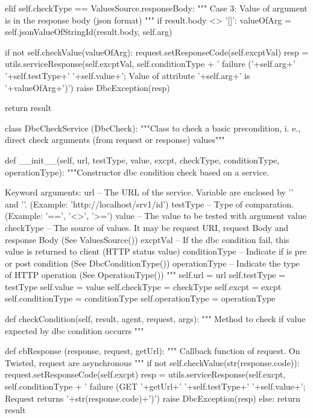         
        elif self.checkType == ValuesSource.responseBody:
            """ Case 3: Value of argument is in the response body (json format) """
            if result.body <> '[]':
                valueOfArg = self.jsonValueOfStringId(result.body, self.arg)
                
                if not self.checkValue(valueOfArg):
                    request.setResponseCode(self.excptVal)
                    resp = utils.serviceResponse(self.excptVal, self.conditionType + ' failure ('+self.arg+' '+self.testType+' '+self.value+'; Value of attribute '+self.arg+' is '+valueOfArg+')')
                    raise DbcException(resp)
                
        return result





class DbcCheckService (DbcCheck):
    """Class to check a basic precondition, i. e., direct check arguments (from request or response) values"""
    
    def __init__(self, url, testType, value, excpt, checkType, conditionType, operationType):
        """Constructor dbc condition check based on a service.
    
        Keyword arguments:
        url -- The URL of the service. Variable are enclosed by '{' and '}'. (Example: 'http://localhost/srv1/{id}')
        testType -- Type of comparation. (Example: '==', '<>', '>=')
        value -- The value to be tested with argument value
        checkType -- The source of values. It may be request URI, request Body and response Body (See ValuesSource())
        excptVal -- If the dbc condition fail, this value is returned to client (HTTP status value)
        conditionType -- Indicate if is pre or post condition (See DbcConditionType())
        operationType -- Indicate the type of HTTP operation (See OperationType())
        """
        self.url = url
        self.testType = testType
        self.value = value
        self.checkType = checkType
        self.excpt = excpt
        self.conditionType = conditionType
        self.operationType = operationType

    def checkCondition(self, result, agent, request, args):
        """ Method to check if value expected by dbc condition occurrs """
        
        
        def cbResponse (response, request, getUrl):
            """ Callback function of request. On Twisted, request are asynchronous """
            if not self.checkValue(str(response.code)):
                request.setResponseCode(self.excpt)
                resp = utils.serviceResponse(self.excpt, self.conditionType + ' failure (GET '+getUrl+' '+self.testType+' '+self.value+'; Request returns '+str(response.code)+')')
                raise DbcException(resp)
            else:
                return result
        
